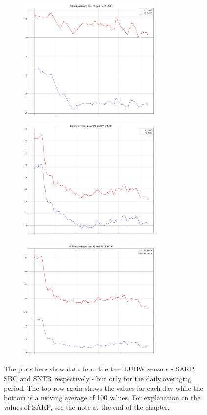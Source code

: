 \documentclass[12pt,a4paper,twoside]{scrartcl}
\numberwithin{equation}{section}
\begin{document}
\begin{figure}[H]
  \begin{subfigure}[t]{0.32\textwidth}
    \includegraphics[width=\textwidth,height=6cm]{figures/1D_SAKP_rolling_plot_}%
    \label{fig:y equals x}
    \caption{}
  \end{subfigure}
  \begin{subfigure}[t]{0.32\textwidth}
    \includegraphics[width=\textwidth,height=6cm]{figures/1D_SBC_rolling_plot_}%
    \label{fig:y equals x}
    \caption{}
  \end{subfigure}
  \begin{subfigure}[t]{0.32\textwidth}
    \includegraphics[width=\textwidth,height=6cm]{figures/1D_SNTR_rolling_plot_}%
    \subcaption{}
  \end{subfigure}      
  \caption{The plots here show data from the tree LUBW sensors - SAKP, SBC and SNTR respectively - but only for the daily averaging period. The top row again shows the values for each day while the bottom is a moving average of 100 values. For explanation on the values of SAKP, see the note at the end of the chapter.}\label{fig:sensor_plots}
\end{figure}
\end{document}
